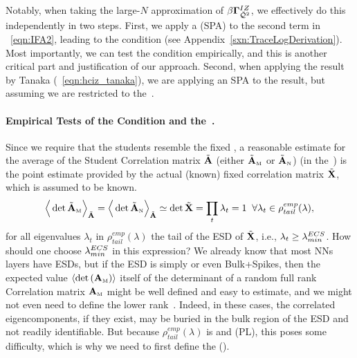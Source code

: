Notably, when taking the large-$N$ approximation of $\beta\mathbf{\Gamma}^{IZ}_{\bar{\mathcal{Q}}^{2}}$, we effectively do this independently in two steps.
First, we apply a \SaddlePointApproximation (SPA) to the second term in \EQN~\ref{eqn:IFA2},
leading to the \TRACELOG condition (see Appendix~\ref{sxn:TraceLogDerivation}).
Most importantly, we can test the \TRACELOG condition empirically,
and this is another critical part and justification of our \SETOL approach.
Second, when applying the result by Tanaka (\EQN~\ref{eqn:hciz_tanaka}),
we are applying an SPA to the result, but assuming we are
restricted to the~\ECS.

\paragraph{Empirical Tests of the \TRACELOG Condition and the~\ECS.}

Since we require that the students resemble the fixed \Teacher, a reasonable estimate for the average of the Student
Correlation matrix $\tilde{\mathbf{A}}$
(either $\tilde{\mathbf{A}}_{\text{\tiny M}}$ or $\tilde{\mathbf{A}}_{\text{\tiny N}}$)  (in the~\ECS)  is the point estimate provided by the actual (known) fixed \Teacher correlation matrix $\tilde{\mathbf{X}}$, which is assumed to be known. %
\begin{align} 
\label{eqn:IFA-ppint}
\Big\langle \det\tilde{\mathbf{A}}_{\text{\tiny M}}\Big\rangle_{\tilde{\mathbf{A}}}=
\Big\langle \det\tilde{\mathbf{A}}_{\text{\tiny N}}\Big\rangle_{\tilde{\mathbf{A}}}
\simeq\det\tilde{\mathbf{X}}=\prod_{t}\lambda_{t}=1\;\;\forall\lambda_{t}\in\rho^{emp}_{tail}(\lambda) ,
\end{align}
for all eigenvalues $\lambda_{t}$ in $\rho^{emp}_{tail}(\lambda)$ the tail of the
ESD of $\tilde{\mathbf{X}}$, i.e., $\lambda_{t}\ge\lambda^{ECS}_{min}$.
%
How should one choose $\lambda^{ECS}_{min}$ in this expression?
We already know that most NNs layers have \FatTailed ESDs, but
if the \Teacher ESD is simply \emph{\RandomLike} or even Bulk+Spikes, then the expected value
$\langle\mbox{}{\text{det}}\left({\mathbf{A}}_{\text{\tiny M}}\right)\rangle$ itself of the determinant
of a random full rank \Student Correlation matrix ${\mathbf{A}}_{\text{\tiny M}}$
might be well defined and easy to estimate, and we might not even need to define the lower rank~\ECS.
Indeed, in these cases, the correlated eigencomponents, if they exist, may be buried in the bulk
region of the ESD and not readily identifiable.
But because $\rho_{tail}^{emp}(\lambda)$ is \FatTailed
and \PowerLaw (PL), this poses some difficulty,
which is why we need to first define the \EffectiveCorrelationSpace (\ECS).


